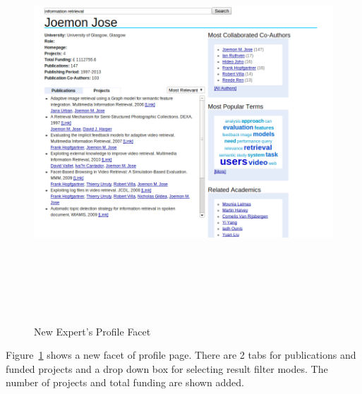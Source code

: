 \begin{figure}
\centering
\includegraphics[width=13cm,height=15cm,keepaspectratio]{./figures/newProfilePagePublication.png}
\caption{New Expert's Profile Facet} \label{fig:newProfilePage} 
\end{figure}
Figure~\ref{fig:newProfilePage} shows a new facet of profile page. There are 2 tabs for publications and funded projects and a drop down box for selecting
result filter modes. The number of projects and total funding are shown added.

